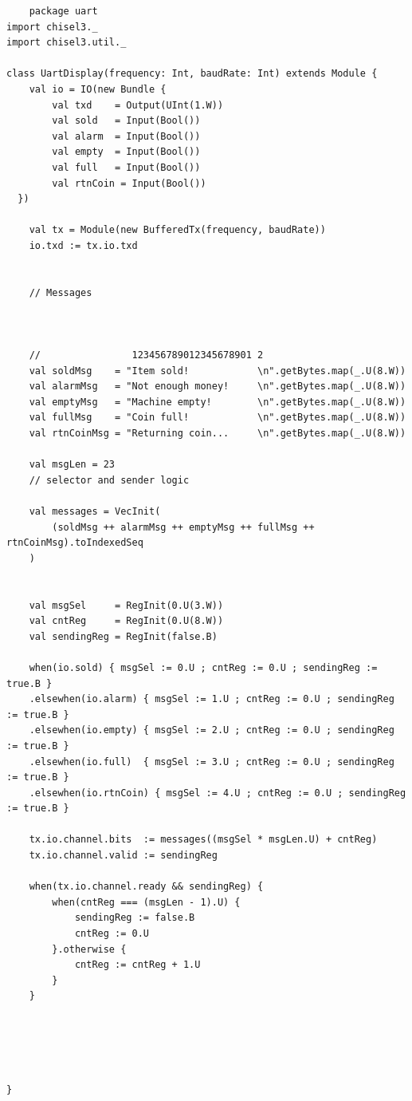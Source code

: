 \begin{lstlisting}
    package uart
import chisel3._
import chisel3.util._

class UartDisplay(frequency: Int, baudRate: Int) extends Module {
    val io = IO(new Bundle {
        val txd    = Output(UInt(1.W))
        val sold   = Input(Bool())
        val alarm  = Input(Bool())
        val empty  = Input(Bool())
        val full   = Input(Bool())
        val rtnCoin = Input(Bool())
  })

    val tx = Module(new BufferedTx(frequency, baudRate))
    io.txd := tx.io.txd


    // Messages
    


    //                123456789012345678901 2
    val soldMsg    = "Item sold!            \n".getBytes.map(_.U(8.W))
    val alarmMsg   = "Not enough money!     \n".getBytes.map(_.U(8.W))
    val emptyMsg   = "Machine empty!        \n".getBytes.map(_.U(8.W))
    val fullMsg    = "Coin full!            \n".getBytes.map(_.U(8.W))
    val rtnCoinMsg = "Returning coin...     \n".getBytes.map(_.U(8.W))

    val msgLen = 23
    // selector and sender logic

    val messages = VecInit(
        (soldMsg ++ alarmMsg ++ emptyMsg ++ fullMsg ++ rtnCoinMsg).toIndexedSeq
    )


    val msgSel     = RegInit(0.U(3.W))
    val cntReg     = RegInit(0.U(8.W))
    val sendingReg = RegInit(false.B)

    when(io.sold) { msgSel := 0.U ; cntReg := 0.U ; sendingReg := true.B }
    .elsewhen(io.alarm) { msgSel := 1.U ; cntReg := 0.U ; sendingReg := true.B }
    .elsewhen(io.empty) { msgSel := 2.U ; cntReg := 0.U ; sendingReg := true.B }
    .elsewhen(io.full)  { msgSel := 3.U ; cntReg := 0.U ; sendingReg := true.B }
    .elsewhen(io.rtnCoin) { msgSel := 4.U ; cntReg := 0.U ; sendingReg := true.B }

    tx.io.channel.bits  := messages((msgSel * msgLen.U) + cntReg)
    tx.io.channel.valid := sendingReg

    when(tx.io.channel.ready && sendingReg) {
        when(cntReg === (msgLen - 1).U) {
            sendingReg := false.B
            cntReg := 0.U
        }.otherwise {
            cntReg := cntReg + 1.U
        }
    }





}

\end{lstlisting}